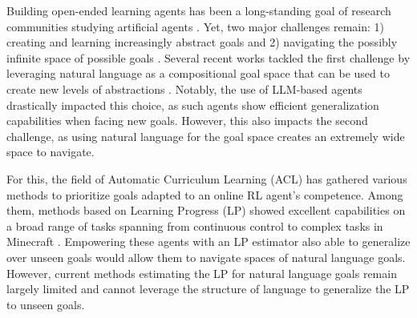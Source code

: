 Building open-ended learning agents has been a long-standing goal of research communities studying artificial agents \citep{schmidhuber_powerplay_2013, Sigaud2023ADO}. Yet, two major challenges remain: 1) creating and learning increasingly abstract goals and 2) navigating the possibly infinite space of possible goals \citep{jiang_learning_2023}. Several recent works tackled the first challenge by leveraging natural language as a compositional goal space that can be used to create new levels of abstractions \citep{wang_voyager_2023, colas_augmenting_2023, pourcel_aces_2024, colas_language_2020}. Notably, the use of LLM-based agents drastically impacted this choice, as such agents show efficient generalization capabilities when facing new goals. However, this also impacts the second challenge, as using natural language for the goal space creates an extremely wide space to navigate.

For this, the field of Automatic Curriculum Learning (ACL) \citep{portelas_automatic_2019} has gathered various methods to prioritize goals adapted to an online RL agent's competence. Among them, methods based on Learning Progress (LP) showed excellent capabilities on a broad range of tasks spanning from continuous control to complex tasks in Minecraft \citep{baranes_r-iac_2009, portelas_teacher_2019, kanitscheider_multi-task_2021}. Empowering these agents with an LP estimator also able to generalize over unseen goals would allow them to navigate spaces of natural language goals. However, current methods estimating the LP for natural language goals remain largely limited and cannot leverage the structure of language to generalize the LP to unseen goals.




